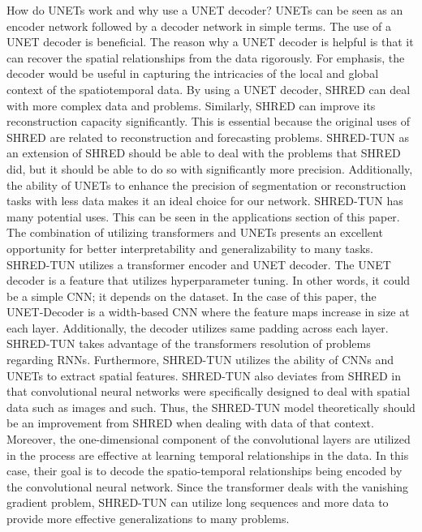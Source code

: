 \documentclass[11pt, a4paper]{article}
\begin{document}
How do UNETs work and why use a UNET decoder? UNETs can be seen as an encoder network followed
by a decoder network in simple terms. The use of a UNET decoder is beneficial. The reason why a UNET
decoder is helpful is that it can recover the spatial relationships from the data rigorously. For emphasis, the
decoder would be useful in capturing the intricacies of the local and global context of the spatiotemporal
data. By using a UNET decoder, SHRED can deal with more complex data and problems. Similarly,
SHRED can improve its reconstruction capacity significantly. This is essential because the original uses
of SHRED are related to reconstruction and forecasting problems. SHRED-TUN as an extension of SHRED
should be able to deal with the problems that SHRED did, but it should be able to do so with significantly
more precision. Additionally, the ability of UNETs to enhance the precision of segmentation or reconstruction
tasks with less data makes it an ideal choice for our network.
SHRED-TUN has many potential uses. This can be seen in the applications section of this paper. The
combination of utilizing transformers and UNETs presents an excellent opportunity for better interpretability
and generalizability to many tasks. SHRED-TUN utilizes a transformer encoder and UNET decoder. The
UNET decoder is a feature that utilizes hyperparameter tuning. In other words, it could be a simple CNN;
it depends on the dataset. In the case of this paper, the UNET-Decoder is a width-based CNN where the
feature maps increase in size at each layer. Additionally, the decoder utilizes same padding across each layer.
SHRED-TUN takes advantage of the transformers resolution of problems regarding RNNs. Furthermore,
SHRED-TUN utilizes the ability of CNNs and UNETs to extract spatial features. SHRED-TUN also deviates
from SHRED in that convolutional neural networks were specifically designed to deal with spatial data such
as images and such. Thus, the SHRED-TUN model theoretically should be an improvement from SHRED
when dealing with data of that context. Moreover, the one-dimensional component of the convolutional
layers are utilized in the process are effective at learning temporal relationships in the data. In this case,
their goal is to decode the spatio-temporal relationships being encoded by the convolutional neural network.
Since the transformer deals with the vanishing gradient problem, SHRED-TUN can utilize
long sequences and more data to provide more effective generalizations to many problems. 
\end{document}
